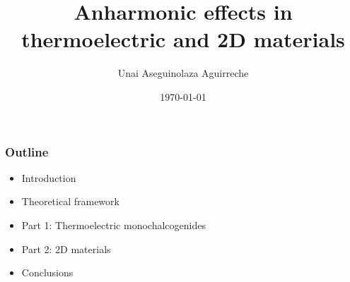 \documentclass{beamer}
\author{Unai Aseguinolaza Aguirreche}
\title{Anharmonic effects in thermoelectric and 2D materials}
\institute{Supervised by Aitor Bergara and Ion Errea}
\date{\today}
\begin{document}


\begin{frame}
 \titlepage
\end{frame}


%
%


\begin{frame}

\frametitle{Outline}
\begin{itemize}
\item Introduction
\vspace{0.5cm}
\item Theoretical framework
\vspace{0.5cm}
\item Part 1: Thermoelectric monochalcogenides
\vspace{0.5cm}
\item Part 2: 2D materials
\vspace{0.5cm}
\item Conclusions
\end{itemize}

\end{frame}

\end{document}
